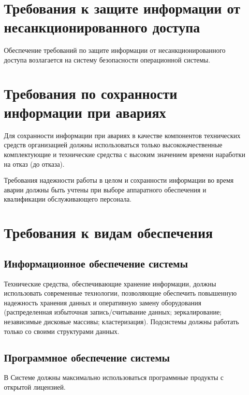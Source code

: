 \section{Требования к защите информации от несанкционированного доступа}
Обеспечение требований по защите информации от несанкционированного доступа возлагается на систему 
безопасности операционной системы.

\section{Требования по сохранности информации при авариях}
Для сохранности информации при авариях в качестве компонентов технических средств организацией должны 
использоваться только высококачественные комплектующие и технические средства с высоким значением времени 
наработки на отказ (до отказа).

Требования надежности работы в целом и сохранности информации во время аварии должны быть учтены при выборе 
аппаратного обеспечения и квалификации обслуживающего персонала.

\section{Требования к видам обеспечения}
\subsection{Информационное обеспечение системы}
Технические средства, обеспечивающие хранение информации, должны использовать современные 
технологии, позволяющие обеспечить повышенную надежность хранения данных и оперативную замену 
оборудования (распределенная избыточная запись/считывание данных; зеркалирование; независимые 
дисковые массивы; кластеризация). Подсистемы должны работать только со своими структурами данных.

\subsection{Программное обеспечение системы}
\label{sec:software}
В Системе должны максимально использоваться программные продукты с открытой лицензией. 

